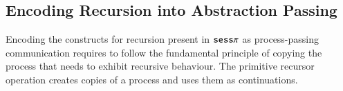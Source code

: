 %




\subsection{Encoding Recursion into Abstraction Passing}\label{ss:fullfotoho}

Encoding the constructs for recursion present in $\mathtt{sess}\pi$ as process-passing
communication requires to follow the fundamental
principle of copying the process that needs to exhibit recursive behaviour.
The primitive recursor operation creates copies of a process and uses them
as continuations.

